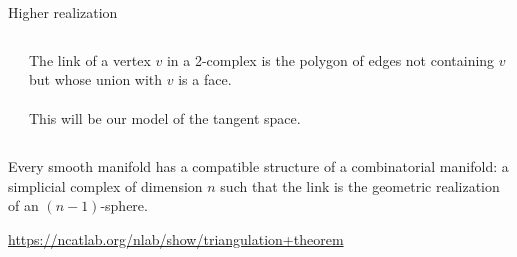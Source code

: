 \documentclass[14pt,aspectratio=169]{beamer}
\renewcommand{\defemph}[1]{\alert{#1}}
\begin{document}
\begin{frame}{Higher realization}
\begin{columns}
\begin{column}{0.5\textwidth}

\end{column}
\begin{column}{0.5\textwidth}
The \defemph{link} of a vertex \( v \) in a 2-complex is the polygon of edges not containing \( v \) but whose union with \( v \) is a face.\\~\\

This will be our model of the tangent space.
\end{column}
\end{columns}
\end{frame}

\begin{frame}
\begin{theorem}[Whitehead (1940)]
Every smooth manifold has a compatible structure of a \alert{combinatorial manifold}: a simplicial complex of dimension \( n \) such that the link is the geometric realization of an \( (n-1) \)-sphere.
\end{theorem}
\url{https://ncatlab.org/nlab/show/triangulation+theorem}
\end{frame}
\end{document}

